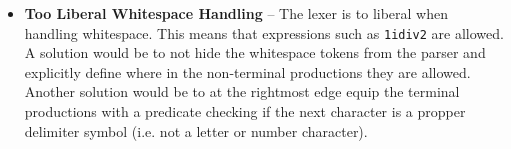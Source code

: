 \begin{itemize}
\item \textbf{Too Liberal Whitespace Handling} -- The lexer is to liberal when handling whitespace. This means that expressions such as \verb!1idiv2! are allowed. A solution would be to not hide the whitespace tokens from the parser and explicitly define where in the non-terminal productions they are allowed. Another solution would be to at the rightmost edge equip the terminal productions with a predicate checking if the next character is a propper delimiter symbol (i.e. not a letter or number character).

\end{itemize}

